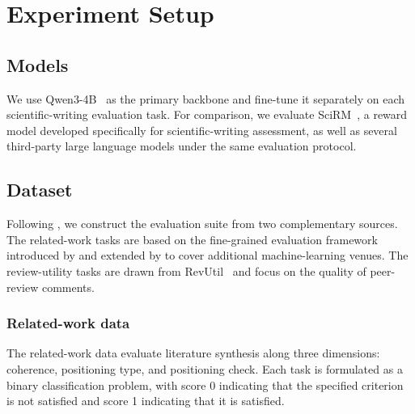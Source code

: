 \section{Experiment Setup}
\label{sec:experiment-setup}

\subsection{Models}

We use Qwen3-4B~\citep{yang-etal-2025-qwen3} as the primary backbone and fine-tune 
it separately on each scientific-writing evaluation task. For comparison, we 
evaluate SciRM~\citep{sahinuc-etal-2026-reward}, a reward model developed 
specifically for scientific-writing assessment, as well as several third-party 
large language models under the same evaluation protocol.

\subsection{Dataset}

Following \citet{sahinuc-etal-2026-reward}, we construct the evaluation suite from 
two complementary sources. The related-work tasks are based on the fine-grained 
evaluation framework introduced by \citet{sahinuc-etal-2025-related-work} and 
extended by \citet{sahinuc-etal-2026-reward} to cover additional machine-learning 
venues. The review-utility tasks are drawn from 
RevUtil~\citep{sadallah-etal-2025-good} and focus on the quality of peer-review 
comments.

\subsubsection*{Related-work data}

The related-work data evaluate literature synthesis along three dimensions:
coherence, positioning type, and positioning check. Each task is formulated
as a binary classification problem, with score 0 indicating that the
specified criterion is not satisfied and score 1 indicating that it is
satisfied.

